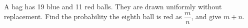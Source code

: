 A bag has 19 blue and 11 red balls. They are drawn uniformly without replacement. Find the probability the eighth ball is red as $\dfrac{m}{n}$, and give $m+n$.
